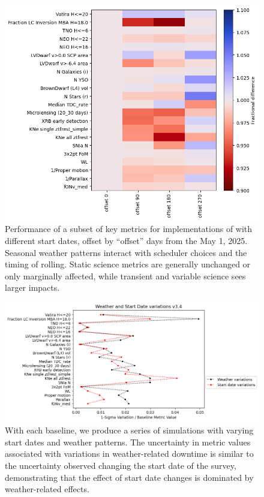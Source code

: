 \begin{figure}
    \centering
    \includegraphics[width=0.9\linewidth]{figures/start_date_scoc_heatmap.png}
    \caption{Performance of a subset of key metrics for implementations of  with different start dates, offset by ``offset'' days from the May 1, 2025. Seasonal weather patterns interact with scheduler choices and the timing of rolling. Static science metrics are generally unchanged or only marginally affected, while transient and variable science sees larger impacts. }
    \label{fig:start_dates}
\end{figure}


\begin{figure}
    \centering
    \includegraphics[width=0.95\linewidth]{figures/uncertainties_v3_4.png}
    \caption{With each baseline, we produce a series of simulations with varying start dates and weather patterns. The uncertainty in metric values associated with variations in weather-related downtime is similar to the uncertainty observed changing the start date of the survey, demonstrating that the effect of start date changes is dominated by weather-related effects.}
    \label{fig:startdates_weather}
\end{figure}
\clearpage